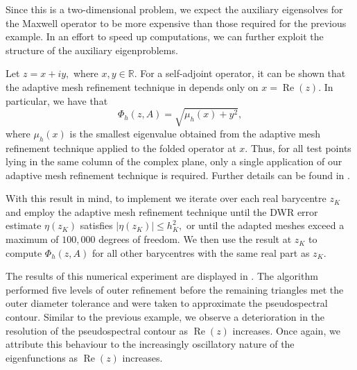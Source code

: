 Since this is a two-dimensional problem, we expect the auxiliary eigensolves for the Maxwell operator to be more expensive than those required for the previous example. In an effort to speed up computations, we can further exploit the structure of the auxiliary eigenproblems. 


Let $z = x + iy,$ where $x, y \in \mathbb{R}.$ For a self-adjoint operator, it can be shown that the adaptive mesh refinement technique in  depends only on $x = \operatorname{Re}(z).$ In particular, we have that 
\begin{equation}
    \Phi_h(z, A) = \sqrt{\mu_h(x) + y^2},
\end{equation}
where $\mu_h(x)$ is the smallest eigenvalue obtained from the adaptive mesh refinement technique applied to the folded operator at $x.$ Thus, for all test points lying in the same column of the complex plane, only a single application of our adaptive mesh refinement technique is required. Further details can be found in .


With this result in mind, to implement  we iterate over each real barycentre $z_K$ and employ the adaptive mesh refinement technique until the DWR error estimate $\eta(z_K)$ satisfies $|\eta(z_K)| \le h_K^2,$ or until the adapted meshes exceed a maximum of $100,000$ degrees of freedom. We then use the result at $z_K$ to compute $\Phi_h(z, A)$ for all other barycentres with the same real part as $z_K$.



The results of this numerical experiment are displayed in . The algorithm performed five levels of outer refinement before the remaining triangles met the outer diameter tolerance and were taken to approximate the pseudospectral contour. Similar to the previous example, we observe a deterioration in the resolution of the pseudospectral contour as $\operatorname{Re}(z)$ increases. Once again, we attribute this behaviour to the increasingly oscillatory nature of the eigenfunctions as $\operatorname{Re}(z) $ increases.


